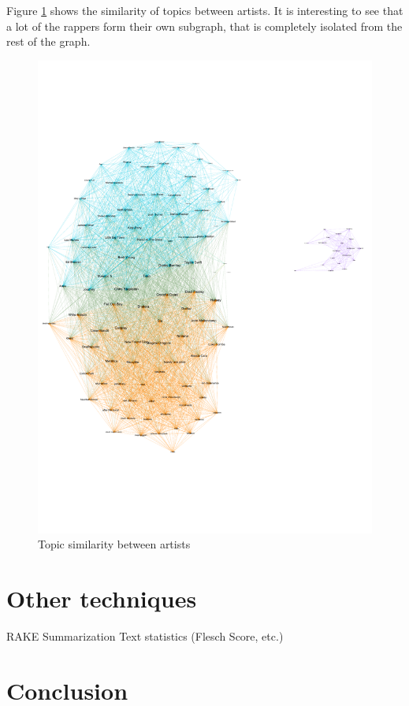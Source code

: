 \documentclass[10pt,a4paper]{article}
\begin{document}
		Figure \ref{fig:topicsimilarity} shows the similarity of topics between artists. It is interesting to see that a lot of the rappers form their own subgraph, that is completely isolated from the rest of the graph.
		
		\begin{figure}[htb]
			\centering
			\includegraphics[trim=0mm 50mm 0mm 50mm, clip, width=\linewidth]{data/topic_similarity}
				\caption{Topic similarity between artists}
				\label{fig:topicsimilarity}
		\end{figure}
	
	\section{Other techniques}
	RAKE
	Summarization
	Text statistics (Flesch Score, etc.)

	\section{Conclusion}
	
	\newpage
	
	
	
	
\end{document}
